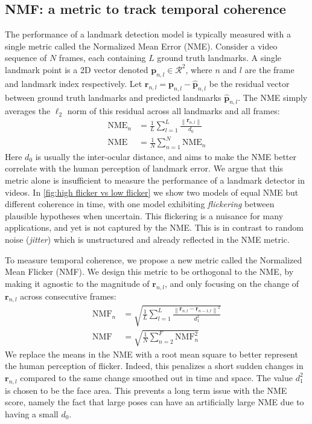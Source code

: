 \documentclass[10pt,twocolumn,letterpaper]{article}
\newcommand\norm[1]{\left\lVert#1\right\rVert}
\def\vp{{\bm{p}}}
\def\vr{{\bm{r}}}
\begin{document}
\subsection{NMF: a metric to track temporal coherence}

The performance of a landmark detection model is typically measured with a single metric called the Normalized Mean Error (NME). Consider a video sequence of $N$ frames, each containing $L$ ground truth landmarks. A single landmark point is a 2D vector denoted $\vp_{n,l} \in \mathcal{R}^2$, where $n$ and $l$ are the frame and landmark index respectively. Let $\vr_{n,l} = \vp_{n,l} - \bm{\hat{p}}_{n,l}$ be the residual vector between ground truth landmarks and predicted landmarks $\bm{\hat{p}}_{n,l}$. The NME simply averages the $\ell_2$ norm of this residual across all landmarks and all frames:
\begin{subequations}
\begin{align}
\text{NME}_{n} &= \frac{1}{L} \sum_{l=1}^{L} \frac{\norm{\vr_{n,l}}}{d_0} \\
\text{NME} &= \frac{1}{N} \sum_{n=1}^N \text{NME}_{n}
\label{eq: NME}
\end{align}
\end{subequations}
Here $d_0$ is usually the inter-ocular distance, and aims to make the NME better correlate with the human perception of landmark error. We argue that this metric alone is insufficient to measure the performance of a landmark detector in videos. In \cref{fig:high flicker vs low flicker} we show two models of equal NME but different coherence in time, with one model exhibiting \textit{flickering} between plausible hypotheses when uncertain. This flickering is a nuisance for many applications, and yet is not captured by the NME. This is in contrast to random noise (\textit{jitter}) which is unstructured and already reflected in the NME metric. 

To measure temporal coherence, we propose a new metric called the Normalized Mean Flicker (NMF). We design this metric to be orthogonal to the NME, by making it agnostic to the magnitude of $\vr_{n,l}$, and only focusing on the change of $\vr_{n,l}$ across consecutive frames:
\begin{subequations}
\begin{align}
\text{NMF}_{n} &= \sqrt{\frac{1}{L} \sum_{l=1}^{L} \frac{\norm{\vr_{n,l} - \vr_{n-1, l}}^2}{d^{2}_1}} \\
\text{NMF} &= \sqrt{\frac{1}{N} \sum_{n=2}^F \text{NMF}^{2}_{n}}
\label{eq: NMF}
\end{align}
\end{subequations}
We replace the means in the NME with a root mean square to better represent the human perception of flicker. Indeed, this penalizes a short sudden changes in $\vr_{n,l}$ compared to the same change smoothed out in time and space. The value $d_1^2$ is chosen to be the face area. This prevents a long term issue with the NME score, namely the fact that large poses can have an artificially large NME due to having a small $d_0$.
\end{document}
